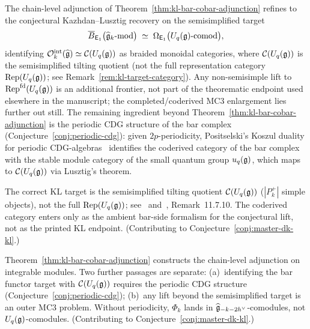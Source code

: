 \begin{conjecture}
\label{conj:kl-bar-cobar-dl}
The chain-level adjunction of
Theorem~\textup{\ref{thm:kl-bar-cobar-adjunction}} refines to the
conjectural Kazhdan--Lusztig recovery on the semisimplified target
\begin{equation}\label{eq:kl-bar-cobar-dl}
\overline{B}_{\mathsf{E}_1}\bigl(\widehat{\mathfrak{g}}_k\text{-}\mathrm{mod}\bigr)
\;\simeq\;
\Omega_{\mathsf{E}_1}\bigl(U_q(\mathfrak{g})\text{-}\mathrm{comod}\bigr),
\end{equation}
identifying
$\mathcal{O}_k^{\mathrm{int}}(\widehat{\mathfrak{g}}) \simeq
\mathcal{C}(U_q(\mathfrak{g}))$
as braided monoidal categories, where $\mathcal{C}(U_q(\mathfrak{g}))$ is the
semisimplified tilting quotient (not the full representation category
$\mathrm{Rep}(U_q(\mathfrak{g}))$; see Remark~\ref{rem:kl-target-category}).
Any non-semisimple lift to
$\mathrm{Rep}^{\mathrm{fd}}(U_q(\mathfrak{g}))$ is an additional frontier,
not part of the theorematic endpoint used elsewhere in the manuscript;
the completed/coderived MC3 enlargement lies further out still.
The remaining ingredient beyond
Theorem~\textup{\ref{thm:kl-bar-cobar-adjunction}} is the periodic
CDG structure of the bar complex
\textup{(}Conjecture~\textup{\ref{conj:periodic-cdg}):} given
$2p$-periodicity, Positselski's Koszul duality for periodic
CDG-algebras~\cite{Positselski11} identifies the coderived category
of the bar complex with the stable module category of the small
quantum group $u_q(\mathfrak{g})$, which maps to
$\mathcal{C}(U_q(\mathfrak{g}))$ via Lusztig's theorem.
\end{conjecture}

\begin{remark}\label{rem:kl-target-category}
The correct KL target is the semisimplified tilting quotient
$\mathcal{C}(U_q(\mathfrak{g}))$ ($|P_k^+|$ simple objects), not the full
$\mathrm{Rep}(U_q(\mathfrak{g}))$; see~\cite{BK01} and~\cite{EGNO},
Remark~11.7.10.  The coderived category enters only as the ambient
bar-side formalism for the conjectural lift, not as the printed KL
endpoint.
(Contributing to Conjecture~\ref{conj:master-dk-kl}.)
\end{remark}

\begin{remark}[Scope]\label{rem:kl-bar-cobar-scope}
Theorem~\ref{thm:kl-bar-cobar-adjunction} constructs the chain-level
adjunction on integrable modules.  Two further passages are separate:
(a)~identifying the bar functor target with $\mathcal{C}(U_q(\mathfrak{g}))$
requires the periodic CDG structure
(Conjecture~\ref{conj:periodic-cdg}); (b)~any lift beyond the
semisimplified target is an outer MC3 problem.  Without periodicity,
$\Phi_k$ lands in $\widehat{\mathfrak{g}}_{-k-2h^\vee}$-comodules, not
$U_q(\mathfrak{g})$-comodules.
(Contributing to Conjecture~\ref{conj:master-dk-kl}.)
\end{remark}

